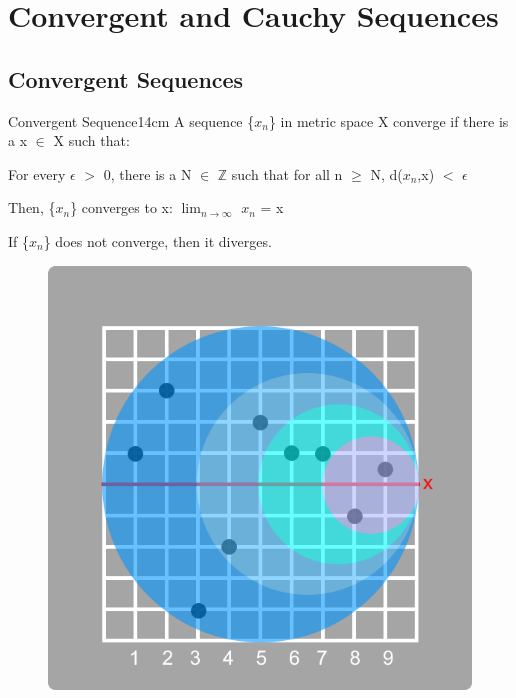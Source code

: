 \newpage

\section[Day 8: Convergence \& Cauchy]{ Convergent and Cauchy Sequences }

\subsection{ Convergent Sequences }

    \begin{definition}{Convergent Sequence}{14cm}
        A sequence \{$x_n$\} in metric space X converge if
        there is a x $\in$ X such that:

        \hspace{1cm}
        For every $\epsilon$ $>$ 0, there is a N $\in$ $\mathbb{Z}$ such that
        for all n $\geq$ N, d($x_n$,x) $<$ $\epsilon$
        
        Then, \{$x_n$\} converges to x: \hspace{1cm}
        $\lim_{n \rightarrow \infty}$ $x_n$ = x

        If \{$x_n$\} does not converge, then it diverges.
    \end{definition}



    \begin{figure}[h]
        \centering
        \includegraphics[scale=0.3]{Images/8.1.1.png}
    \end{figure}



